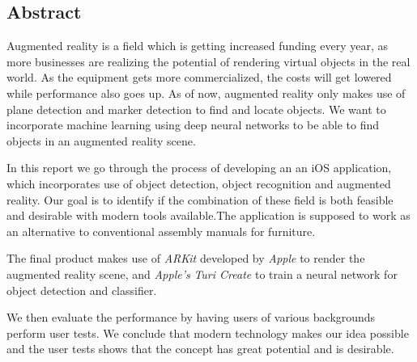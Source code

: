 \begin{center}
\section*{Abstract}
Augmented reality is a field which is getting increased funding every year, as more businesses are realizing the potential of rendering virtual objects in the real world. As the equipment gets more commercialized, the costs will get lowered while performance also goes up. As of now, augmented reality only makes use of plane detection and marker detection to find and locate objects. We want to incorporate machine learning using deep neural networks to be able to find objects in an augmented reality scene. 

In this report we go through the process of developing an an iOS application, which incorporates use of object detection, object recognition and augmented reality. Our goal is to identify if the combination of these field is both feasible and desirable with modern tools available.The application is supposed to work as an alternative to conventional assembly manuals for furniture. 

The final product makes use of \textit{ARKit} developed by \textit{Apple} to render the augmented reality scene, and \textit{Apple's} \textit{Turi Create} to train a neural network for object detection and classifier. 

We then evaluate the performance by having users of various backgrounds perform user tests. We conclude that modern technology makes our idea possible and the user tests shows that the concept has great potential and is desirable.
\end{center}



\newpage